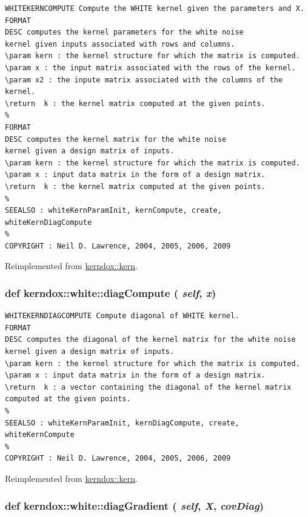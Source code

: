 \footnotesize\begin{verbatim}WHITEKERNCOMPUTE Compute the WHITE kernel given the parameters and X.
FORMAT
DESC computes the kernel parameters for the white noise
kernel given inputs associated with rows and columns.
\param kern : the kernel structure for which the matrix is computed.
\param x : the input matrix associated with the rows of the kernel.
\param x2 : the inpute matrix associated with the columns of the kernel.
\return  k : the kernel matrix computed at the given points.
%
FORMAT
DESC computes the kernel matrix for the white noise
kernel given a design matrix of inputs.
\param kern : the kernel structure for which the matrix is computed.
\param x : input data matrix in the form of a design matrix.
\return  k : the kernel matrix computed at the given points.
%
SEEALSO : whiteKernParamInit, kernCompute, create, whiteKernDiagCompute
%
COPYRIGHT : Neil D. Lawrence, 2004, 2005, 2006, 2009

\end{verbatim}
\normalsize
 

Reimplemented from \hyperlink{classkerndox_1_1kern}{kerndox::kern}.\hypertarget{classkerndox_1_1white_857c95585d0e30876382adacf58b52c2}{
\subsubsection[{diagCompute}]{\setlength{\rightskip}{0pt plus 5cm}def kerndox::white::diagCompute ( {\em self}, \/   {\em x})}}
\label{classkerndox_1_1white_857c95585d0e30876382adacf58b52c2}




\footnotesize\begin{verbatim}WHITEKERNDIAGCOMPUTE Compute diagonal of WHITE kernel.
FORMAT
DESC computes the diagonal of the kernel matrix for the white noise kernel given a design matrix of inputs.
\param kern : the kernel structure for which the matrix is computed.
\param x : input data matrix in the form of a design matrix.
\return  k : a vector containing the diagonal of the kernel matrix
computed at the given points.
%
SEEALSO : whiteKernParamInit, kernDiagCompute, create, whiteKernCompute
%
COPYRIGHT : Neil D. Lawrence, 2004, 2005, 2006, 2009

\end{verbatim}
\normalsize
 

Reimplemented from \hyperlink{classkerndox_1_1kern}{kerndox::kern}.\hypertarget{classkerndox_1_1white_2f32c7f63de971d57148ab933073a791}{
\subsubsection[{diagGradient}]{\setlength{\rightskip}{0pt plus 5cm}def kerndox::white::diagGradient ( {\em self}, \/   {\em X}, \/   {\em covDiag})}}
\label{classkerndox_1_1white_2f32c7f63de971d57148ab933073a791}




